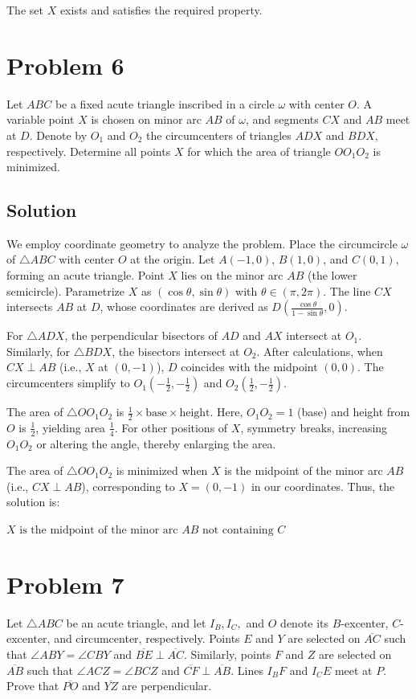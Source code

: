 \documentclass{article}
\begin{document}
The set \( X \) exists and satisfies the required property.
\hrulefill
\newpage
\section*{Problem 6}
Let \(ABC\) be a fixed acute triangle inscribed in a circle \(\omega\) with center \(O\). A variable point \(X\) is chosen on minor arc \(AB\) of \(\omega\), and segments \(CX\) and \(AB\) meet at \(D\). Denote by \(O_1\) and \(O_2\) the circumcenters of triangles \(ADX\) and \(BDX\), respectively. Determine all points \(X\) for which the area of triangle \(OO_1O_2\) is minimized.

\subsection*{Solution}
We employ coordinate geometry to analyze the problem. Place the circumcircle \(\omega\) of \(\triangle ABC\) with center \(O\) at the origin. Let \(A(-1,0)\), \(B(1,0)\), and \(C(0,1)\), forming an acute triangle. Point \(X\) lies on the minor arc \(AB\) (the lower semicircle). Parametrize \(X\) as \((\cos\theta, \sin\theta)\) with \(\theta \in (\pi, 2\pi)\). The line \(CX\) intersects \(AB\) at \(D\), whose coordinates are derived as \(D\left(\frac{\cos\theta}{1 - \sin\theta}, 0\right)\).

For \(\triangle ADX\), the perpendicular bisectors of \(AD\) and \(AX\) intersect at \(O_1\). Similarly, for \(\triangle BDX\), the bisectors intersect at \(O_2\).
After calculations, when \(CX \perp AB\) (i.e., \(X\) at \((0,-1)\)), \(D\) coincides with the midpoint \((0,0)\). The circumcenters simplify to \(O_1\left(-\frac{1}{2}, -\frac{1}{2}\right)\) and \(O_2\left(\frac{1}{2}, -\frac{1}{2}\right)\).

The area of \(\triangle OO_1O_2\) is \(\frac{1}{2} \times \text{base} \times \text{height}\). Here, \(O_1O_2 = 1\) (base) and height from \(O\) is \(\frac{1}{2}\), yielding area \(\frac{1}{4}\).
For other positions of \(X\), symmetry breaks, increasing \(O_1O_2\) or altering the angle, thereby enlarging the area.

The area of \(\triangle OO_1O_2\) is minimized when \(X\) is the midpoint of the minor arc \(AB\) (i.e., \(CX \perp AB\)), corresponding to \(X = (0,-1)\) in our coordinates. Thus, the solution is:

\(
\boxed{X \text{ is the midpoint of the minor arc } AB \text{ not containing } C}
\)
\hrulefill
\newpage
\section*{Problem 7}
Let \(\triangle ABC\) be an acute triangle, and let \(I_B, I_C,\) and \(O\) denote its \(B\)-excenter, \(C\)-excenter, and circumcenter, respectively. Points \(E\) and \(Y\) are selected on \(\overline{AC}\) such that \(\angle ABY = \angle CBY\) and \(\overline{BE}\perp\overline{AC}.\) Similarly, points \(F\) and \(Z\) are selected on \(\overline{AB}\) such that \(\angle ACZ = \angle BCZ\) and \(\overline{CF}\perp\overline{AB}.\)
Lines \(I_B F\) and \(I_C E\) meet at \(P.\) Prove that \(\overline{PO}\) and \(\overline{YZ}\) are perpendicular.
\end{document}
